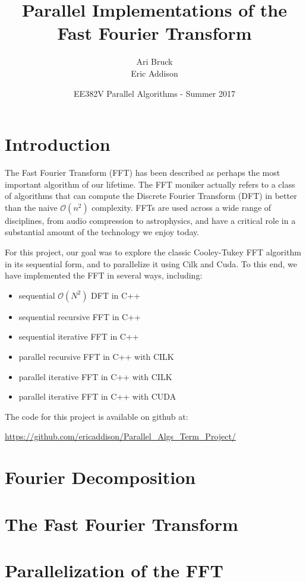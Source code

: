 \documentclass{article}
\title{Parallel Implementations of the\\Fast Fourier Transform}
\author{Ari Bruck\\Eric Addison }
\date{EE382V Parallel Algorithms - Summer 2017}
\begin{document}
\maketitle

\section{Introduction}
The Fast Fourier Transform (FFT) has been described as perhaps the most important algorithm of our lifetime. The FFT moniker actually refers to a class of algorithms that can compute the Discrete Fourier Transform (DFT) in better than the naive $\mathcal{O}(n^2)$ complexity. FFTs are used across a wide range of disciplines, from audio compression to astrophysics, and have a critical role in a substantial amount of the technology we enjoy today.

For this project, our goal was to explore the classic Cooley-Tukey FFT algorithm in its sequential form, and to parallelize it using Cilk and Cuda. To this end, we have implemented the FFT in several ways, including:
\begin{itemize}
    \item sequential $\mathcal{O}(N^2)$ DFT in C++
    \item sequential recursive FFT in C++
    \item sequential iterative FFT in C++
    \item parallel recursive FFT in C++ with CILK
    \item parallel iterative FFT in C++ with CILK
    \item parallel iterative FFT in C++ with CUDA
\end{itemize}

The code for this project is available on github at: 
\begin{center}
\url{https://github.com/ericaddison/Parallel\_Algs\_Term\_Project/}
\end{center}


\section{Fourier Decomposition}



\section{The Fast Fourier Transform}


\section{Parallelization of the FFT}

\end{document}
